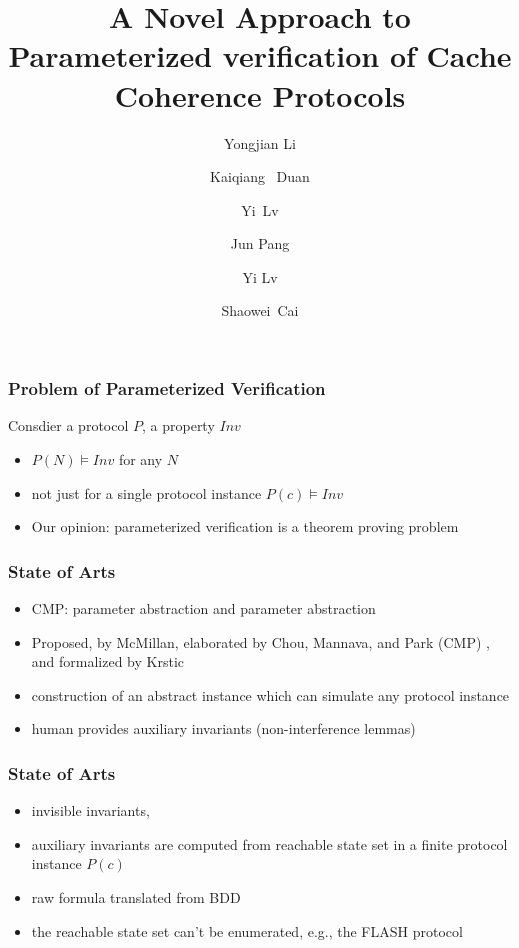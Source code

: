 \documentclass{beamer}
\begin{document}


\title{ A Novel Approach to Parameterized verification of Cache Coherence Protocols}

\author{Yongjian Li \and  Kaiqiang~ Duan \and Yi~Lv \and Jun Pang \and Yi Lv
\and Shaowei~Cai}


\frame{\titlepage}

\begin{frame}\frametitle{Problem of Parameterized Verification}
Consdier a protocol $P$, a property $Inv$
\begin{itemize}
\item  $P(N) \models Inv$ for any $N$
\item not just for a single protocol instance  $P(c)\models Inv$
\item Our opinion: parameterized verification is a theorem proving problem
\end{itemize}
\end{frame}

\begin{frame}\frametitle{State of Arts}
\begin{itemize}
\item CMP:  parameter abstraction and parameter abstraction
\item Proposed, by McMillan, elaborated by Chou, Mannava, and Park (CMP) , and formalized
by Krstic
\item construction of an abstract instance which can simulate any protocol instance
\item human provides auxiliary invariants (non-interference lemmas)
\end{itemize}
\end{frame}


\begin{frame}\frametitle{State of Arts }
\begin{itemize}
\item  invisible invariants,
\item  auxiliary invariants are computed from reachable state set in a finite protocol
instance $P(c)$
\item raw formula translated from BDD
\item  the reachable state set can't be enumerated, e.g., the FLASH protocol
\end{itemize}
\end{frame}
\end{document}
